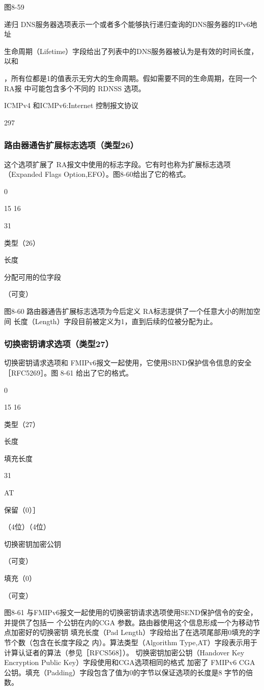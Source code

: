 图8-59

递归 DNS服务器选项表示一个或者多个能够执行递归查询的DNS服务器的IPv6地址

生命周期（Lifetime）字段给出了列表中的DNS服务器被认为是有效的时间长度，以和

，所有位都是1的值表示无穷大的生命周期。假如需要不同的生命周期，在同一个RA报
中可能包含多个不同的 RDNSS 选项。

ICMPv4 和ICMPv6:Internet 控制报文协议

297

\subsubsection{路由器通告扩展标志选项（类型26）}
这个选项扩展了 RA报文中使用的标志字段。它有时也称为扩展标志选项（Expanded
Flags Option,EFO）。图8-60给出了它的格式。

0

15 16

31

类型（26）

长度

分配可用的位字段

（可变）

图8-60 路由器通告扩展标志选项为今后定义 RA标志提供了一个任意大小的附加空间
长度（Length）字段目前被定义为1，直到后续的位被分配为止。

\subsubsection{切换密钥请求选项（类型27）}
切换密钥请求选项和 FMIPv6报文一起使用，它使用SBND保护信令信息的安全
［RFC5269］。图 8-61 给出了它的格式。

0

15 16

类型（27）

长度

填充长度

31

AT

保留（0）］

（4位）（4位）

切换密钥加密公钥

（可变）

填充（0）

（可变）

图8-61 与FMIPv6报文一起使用的切换密钥请求选项使用SEND保护信令的安全，并提供了包括一
个公钥在内的CGA 参数。路由器使用这个信息形成一个为移动节点加密好的切换密钥
填充长度（Pad Length）字段给出了在选项尾部用0填充的字节个数（包含在长度字段之
内）。算法类型（Algorithm Type,AT）字段表示用于计算认证者的算法（参见［RFCS568］）。
切换密钥加密公钥（Handover Key Encryption Public Key）字段使用和CGA选项相同的格式
加密了 FMIPv6 CGA公钥。填充（Padding）字段包含了值为0的字节以保证选项的长度是8
字节的倍数。

